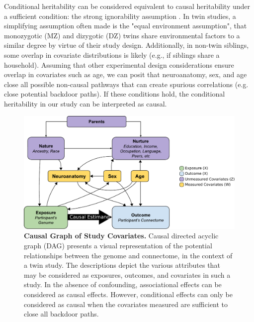 Conditional heritability can be considered equivalent to causal heritability under a sufficient condition: the strong ignorability assumption \cite{rosenbaum1983central}.  In twin studies, a simplifying assumption often made is the "equal environment assumption", that monozygotic (MZ) and dizygotic (DZ) twins share environmental factors to a similar degree by virtue of their study design. Additionally, in non-twin siblings, some overlap in covariate distributions is likely (e.g., if siblings share a household). Assuming that other experimental design considerations ensure overlap in covariates such as age, we can posit that neuroanatomy, sex, and age close all possible non-causal pathways that can create spurious correlations (e.g. close potential backdoor paths). If these conditions hold, the conditional heritability in our study can be interpreted as causal. 


\begin{figure}
\centering
\includegraphics[width=0.8\linewidth]{figures/herit/dag.pdf}
\caption{\textbf{Causal Graph of Study Covariates.} Causal directed acyclic graph (DAG) presents a visual representation of the potential relationships between the genome and connectome, in the context of a twin study. The descriptions depict the various attributes that may be considered as exposures, outcomes, and covariates in such a study. In the absence of confounding, associational effects can be considered as causal effects. However, conditional effects can only be considered as causal when the covariates measured are sufficient to close all backdoor paths.}
\label{fig:dag}
\end{figure}


